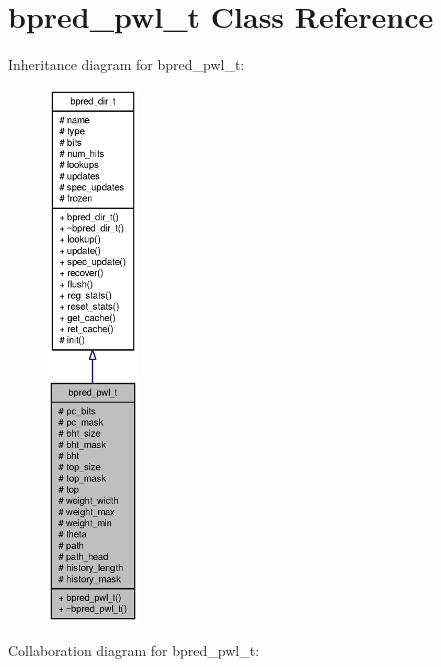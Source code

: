 \section{bpred\_\-pwl\_\-t Class Reference}
\label{classbpred__pwl__t}
Inheritance diagram for bpred\_\-pwl\_\-t:\nopagebreak
\begin{figure}[H]
\begin{center}
\leavevmode
\includegraphics[height=400pt]{classbpred__pwl__t__inherit__graph}
\end{center}
\end{figure}
Collaboration diagram for bpred\_\-pwl\_\-t:\nopagebreak
